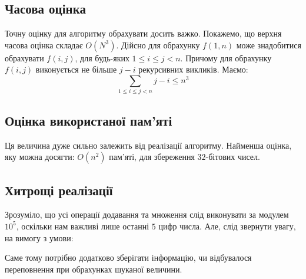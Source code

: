 \documentclass[
  11pt,
  a4paper
]{extarticle}
\theoremstyle{definition}
\theoremstyle{remark}
\begin{document}
  \subsection{Часова оцінка}
    Точну оцінку для алгоритму обрахувати досить важко. Покажемо, що верхня часова оцінка складає $O(N^{3})$. 
    Дійсно для обрахунку $f(1, n)$ може знадобитися обрахувати $f(i, j)$, для будь-яких $1 \leq i \leq j < n$. 
    Причому для обрахунку $f(i, j)$ виконується не більше $j - i$ рекурсивних викликів. Маємо: 
    \begin{equation*}
      \sum_{1 \leq i \leq j < n}{j - i} \leq n^{3}
    \end{equation*}
  \subsection{Оцінка використаної пам'яті}
    Ця величина дуже сильно залежить від реалізації алгоритму. Найменша оцінка, яку можна досягти: $O(n^{2})$ пам’яті, для збереження $32$-бітових чисел.
  \subsection{Хитрощі реалізації}
    Зрозуміло, що усі операції додавання та множення слід виконувати за модулем $10^{5}$, оскільки нам важливі лише останні $5$ цифр числа. Але, слід звернути увагу, на вимогу з умови:
    \begin{quote}
    \end{quote}
    Саме тому потрібно додатково зберігати інформацію, чи відбувалося переповнення при обрахунках шуканої величини.
\end{document}
